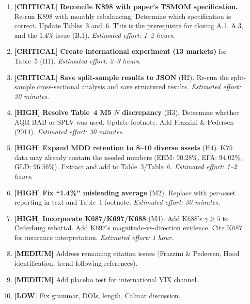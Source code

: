 \documentclass[12pt,a4paper]{article}
\begin{document}
\begin{enumerate}

\item \textbf{[CRITICAL]} \textbf{Reconcile K898 with paper's TSMOM specification.} Re-run K898 with monthly rebalancing. Determine which specification is correct. Update Tables~3 and~6. This is the prerequisite for closing A.1, A.3, and the 1.4\% issue (B.1). \textit{Estimated effort: 1--2 hours.}

\item \textbf{[CRITICAL]} \textbf{Create international experiment (13 markets)} for Table~5 (H1). \textit{Estimated effort: 2--3 hours.}

\item \textbf{[CRITICAL]} \textbf{Save split-sample results to JSON} (H2). Re-run the split-sample cross-sectional analysis and save structured results. \textit{Estimated effort: 30 minutes.}

\item \textbf{[HIGH]} \textbf{Resolve Table~4 M5 $N$ discrepancy} (H3). Determine whether AQR BAB or SPLV was used. Update footnote. Add Frazzini \& Pedersen (2014). \textit{Estimated effort: 30 minutes.}

\item \textbf{[HIGH]} \textbf{Expand MDD retention to 8--10 diverse assets} (H4). K79 data may already contain the needed numbers (EEM: 90.28\%, EFA: 94.02\%, GLD: 96.56\%). Extract and add to Table~3/Table~6. \textit{Estimated effort: 1--2 hours.}

\item \textbf{[HIGH]} \textbf{Fix ``1.4\%'' misleading average} (M2). Replace with per-asset reporting in text and Table~1 footnote. \textit{Estimated effort: 30 minutes.}

\item \textbf{[HIGH]} \textbf{Incorporate K687/K697/K688} (M4). Add K688's $\gamma \geq 5$ to Cederburg rebuttal. Add K697's magnitude-vs-direction evidence. Cite K687 for insurance interpretation. \textit{Estimated effort: 1 hour.}

\item \textbf{[MEDIUM]} Address remaining citation issues (Frazzini \& Pedersen, Hood identification, trend-following references).

\item \textbf{[MEDIUM]} Add placebo test for international VIX channel.

\item \textbf{[LOW]} Fix grammar, DOIs, length, Calmar discussion.

\end{enumerate}
\end{document}
